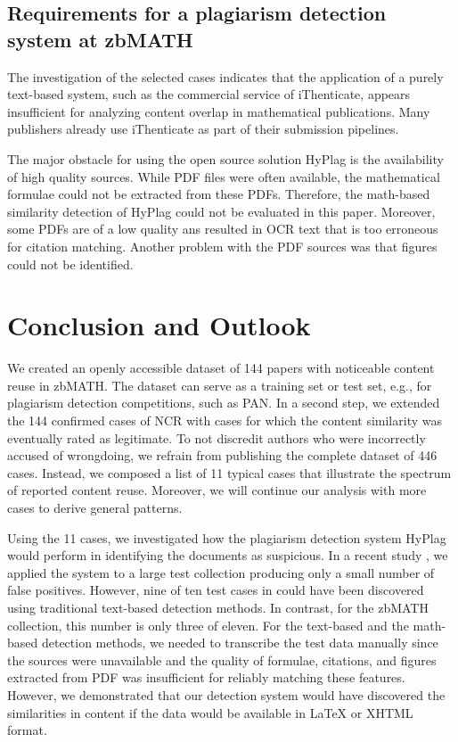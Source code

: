 \documentclass{llncs}
\begin{document}
\subsection{Requirements for a plagiarism detection system at zbMATH}
The investigation of the selected cases indicates that the application of a purely text-based system, such as the commercial service of iThenticate, appears insufficient for analyzing content overlap in mathematical publications. Many publishers already use iThenticate as part of their submission pipelines.

The major obstacle for using the open source solution HyPlag is the availability of high quality sources. While PDF files were often available, the mathematical formulae could not be extracted from these PDFs. Therefore, the math-based similarity detection of HyPlag \cite{Meuschke2017} could not be evaluated in this paper.
Moreover, some PDFs are of a low quality ans resulted in OCR text that is too erroneous for citation matching.
Another problem with the PDF sources was that figures could not be identified.

\section{Conclusion and Outlook} \label{sec.concloutl}
We created an openly accessible dataset of 144 papers with noticeable content reuse in zbMATH. The dataset can serve as a training set or test set, e.g., for plagiarism detection competitions, such as PAN. In a second step, we extended the 144 confirmed cases of NCR with cases for which the content similarity was eventually rated as legitimate. To not discredit authors who were incorrectly accused of wrongdoing, we refrain from publishing the complete dataset of 446 cases. Instead, we composed a list of 11 typical cases that illustrate the spectrum of reported content reuse. Moreover, we will continue our analysis with more cases to derive general patterns.

Using the 11 cases, we investigated how the plagiarism detection system HyPlag would perform in identifying the documents as suspicious. In a recent study \cite{Meuschke2019}, we applied the system to a large test collection producing only a small number of false positives. However, nine of ten test cases in \cite{Meuschke2019} could have been discovered using traditional text-based detection methods. In contrast, for the zbMATH collection, this number is only three of eleven.
For the text-based and the math-based detection methods, we needed to transcribe the test data manually since the sources were unavailable and the quality of formulae, citations, and figures extracted from PDF was insufficient for reliably matching these features. However, we demonstrated that our detection system would have discovered the similarities in content if the data would be available in LaTeX or XHTML format.
\end{document}
